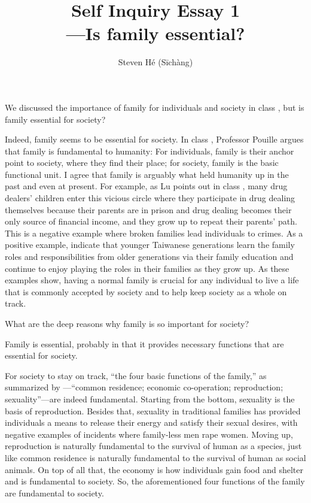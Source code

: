 \documentclass[12pt]{article}
\title{Self Inquiry Essay 1\\—Is family essential?}
\author{Steven Hé (Sīchàng)}
\begin{document}
\maketitle
We discussed the importance of family for individuals and society
in class \citep{pouille2023ethics},
but is family essential for society?

Indeed, family seems to be essential for society.
In class \citep{pouille2023ethics},
Professor Pouille argues that family is fundamental to humanity:
For individuals, family is their anchor point to society,
where they find their place;
for society, family is the basic functional unit.
I agree that family is arguably what held humanity up in the past and even at
present.
For example, as Lu points out in class \citep{pouille2023ethics},
many drug dealers' children enter this vicious circle where
they participate in drug dealing themselves because their parents are in prison
and drug dealing becomes their only source of financial income,
and they grow up to repeat their parents' path.
This is a negative example where broken families lead individuals to crimes.
As a positive example, \citet{lu1998family} indicate that
younger Taiwanese generations learn the family roles and responsibilities from
older generations via their family education and
continue to enjoy playing the roles in their families as they grow up.
As these examples show, having a normal family is crucial for any individual to
live a life that is commonly accepted by society and to help keep society as a
whole on track.

What are the deep reasons why family is so important for society?

Family is essential, probably in that it provides necessary functions
that are essential for society.

For society to stay on track, ``the four basic functions of the family,''
as summarized by \citet[p. 60]{gittins1993family}—``common residence;
economic co-operation; reproduction; sexuality''—are indeed fundamental.
Starting from the bottom, sexuality is the basis of reproduction.
Besides that, sexuality in traditional families has provided individuals
a means to release their energy and satisfy their sexual desires,
with negative examples of incidents where family-less men rape women.
Moving up, reproduction is naturally fundamental to the survival of human as
a species, just like common residence is naturally fundamental to the survival
of human as social animals.
On top of all that, the economy is how individuals gain food and shelter and
is fundamental to society.
So, the aforementioned four functions of the family are fundamental to society.
\end{document}
